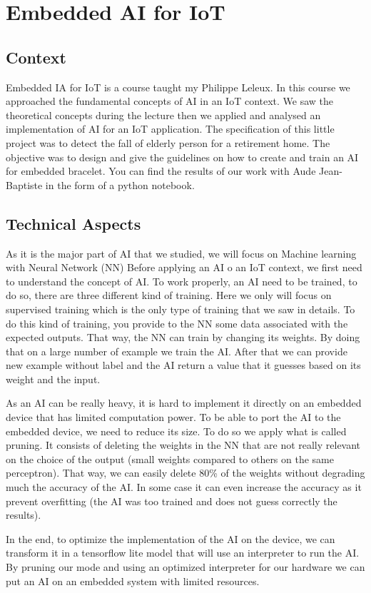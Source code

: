 \section{Embedded AI for IoT}

\subsection{Context}

Embedded IA for IoT is a course taught my Philippe Leleux. In this course we approached the fundamental concepts of AI in an IoT context. We saw the theoretical concepts during the lecture then we applied and analysed an implementation of AI for an IoT application. The specification of this little project was to detect the fall of elderly person for a retirement home. The objective was to design and give the guidelines on how to create and train an AI for embedded bracelet. You can find the results of our work with Aude Jean-Baptiste in the form of a python notebook.

\subsection{Technical Aspects}

As it is the major part of AI that we studied, we will focus on Machine learning with Neural Network (NN)
Before applying an AI o an IoT context, we first need to understand the concept of AI. To work properly, an AI need to be trained, to do so, there are three different kind of training. Here we only will focus on supervised training which is the only type of training that we saw in details. To do this kind of training, you provide to the NN some data associated with the expected outputs. That way, the NN can train by changing its weights. By doing that on a large number of example we train the AI. After that we can provide new example without label and the AI return a value that it guesses based on its weight and the input. 
\\\par
As an AI can be really heavy, it is hard to implement it directly on an embedded device that has limited computation power. To be able to port the AI to the embedded device, we need to reduce its size. To do so we apply what is called pruning. It consists of deleting the weights in the NN that are not really relevant on the choice of the output (small weights compared to others on the same perceptron). That way, we can easily delete 80\% of the weights without degrading much the accuracy of the AI. In some case it can even increase the accuracy as it prevent overfitting (the AI was too trained and does not guess correctly the results).
\\\par
In the end, to optimize the implementation of the AI on the device, we can transform it in a tensorflow lite model that will use an interpreter to run the AI. By pruning our mode and using an optimized interpreter for our hardware we can put an AI on an embedded system with limited resources.

